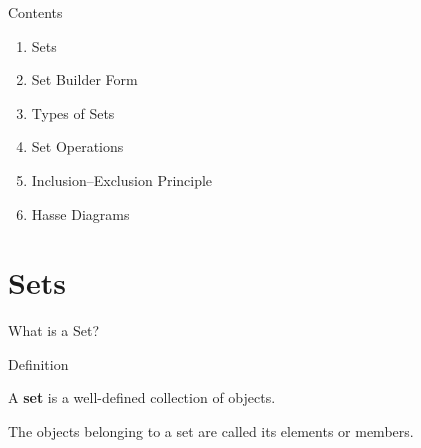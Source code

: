 \documentclass[aspectratio=169,11pt]{beamer}
\begin{document}
\begin{frame}{Contents}

\begin{enumerate}

\item Sets

\vspace{0.12cm}

\item Set Builder Form

\vspace{0.12cm}

\item Types of Sets

\vspace{0.12cm}

\item Set Operations

\vspace{0.12cm}

\item Inclusion--Exclusion Principle

\vspace{0.12cm}

\item Hasse Diagrams

\end{enumerate}

\end{frame}


\section{Sets}


\begin{frame}{What is a Set?}

\begin{block}{Definition}

A \textbf{set} is a well-defined collection of objects.

\end{block}

\vspace{0.35cm}

The objects belonging to a set are called its \textcolor{MathGreen}{elements}
or \textcolor{MathGreen}{members}.

\end{frame}
\end{document}
